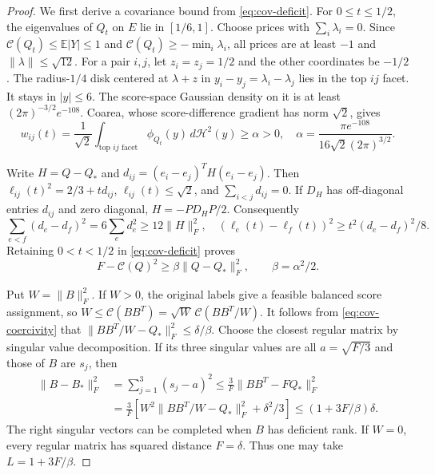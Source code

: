 \documentclass[11pt,reqno]{amsart}
\theoremstyle{remark}
\newcommand{\E}{\mathbb E}
\newcommand{\norm}[1]{\lVert #1\rVert}
\newcommand{\HH}{\mathcal H}
\begin{document}
\begin{proof}
We first derive a covariance bound from \eqref{eq:cov-deficit}.
For $0\le t\le1/2$, the eigenvalues of $Q_t$ on $E$ lie in $[1/6,1]$.
Choose prices with $\sum_i\lambda_i=0$. Since
$\mathcal C(Q_t)\le\E|Y|\le1$ and
$\mathcal C(Q_t)\ge-\min_i\lambda_i$, all prices are at least $-1$
and $\norm{\lambda}\le\sqrt{12}$.
For a pair $i,j$, let $z_i=z_j=1/2$ and the other coordinates be $-1/2$.
The radius-$1/4$ disk centered at $\lambda+z$ in
$y_i-y_j=\lambda_i-\lambda_j$ lies in the top $ij$ facet.
It stays in $|y|\le6$. The score-space Gaussian density on it is at least
$(2\pi)^{-3/2}e^{-108}$.
Coarea, whose score-difference gradient has norm $\sqrt2$, gives
\[
 w_{ij}(t)=\frac1{\sqrt2}\int_{\text{top }ij\text{ facet}}
          \phi_{Q_t}(y)\,d\HH^2(y)\ge\alpha>0,
 \quad
 \alpha=\frac{\pi e^{-108}}{16\sqrt2(2\pi)^{3/2}}.
\]

Write $H=Q-Q_*$ and $d_{ij}=(e_i-e_j)^TH(e_i-e_j)$.
Then $\ell_{ij}(t)^2=2/3+td_{ij}$, $\ell_{ij}(t)\le\sqrt2$,
and $\sum_{i<j}d_{ij}=0$. If $D_H$ has off-diagonal entries $d_{ij}$
and zero diagonal, $H=-PD_HP/2$. Consequently
\[
 \sum_{e<f}(d_e-d_f)^2=6\sum_e d_e^2\ge12\norm{H}_F^2,
 \quad
 (\ell_e(t)-\ell_f(t))^2\ge t^2(d_e-d_f)^2/8.
\]
Retaining $0<t<1/2$ in \eqref{eq:cov-deficit} proves
\begin{equation}\label{eq:cov-coercivity}
 F-\mathcal C(Q)^2\ge\beta\norm{Q-Q_*}_F^2,
 \qquad \beta=\alpha^2/2.
\end{equation}

Put $W=\norm{B}_F^2$. If $W>0$, the original labels give a feasible
balanced score assignment, so
$W\le\mathcal C(BB^T)=\sqrt W\,\mathcal C(BB^T/W)$.
It follows from \eqref{eq:cov-coercivity} that
$\norm{BB^T/W-Q_*}_F^2\le\delta/\beta$.
Choose the closest regular matrix by singular value decomposition.
If its three singular values are all $a=\sqrt{F/3}$ and those of $B$
are $s_j$, then
\begin{align*}
 \norm{B-B_*}_F^2
 &=\sum_{j=1}^3(s_j-a)^2
 \le\frac3F\norm{BB^T-FQ_*}_F^2\\
 &=\frac3F\left[W^2\norm{BB^T/W-Q_*}_F^2+\delta^2/3\right]
 \le(1+3F/\beta)\delta.
\end{align*}
The right singular vectors can be completed when $B$ has deficient rank.
If $W=0$, every regular matrix has squared distance $F=\delta$.
Thus one may take $L=1+3F/\beta$.


\end{proof}
\end{document}
